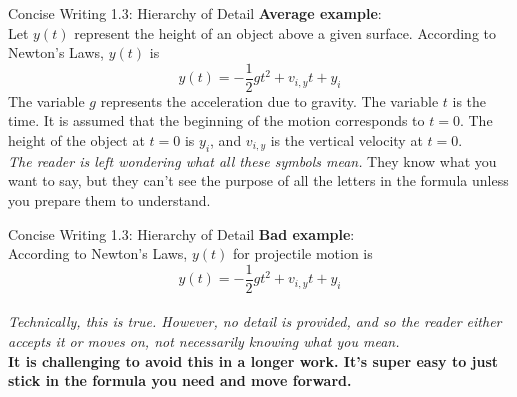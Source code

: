 \documentclass{beamer}
\begin{document}
\begin{frame}{Concise Writing 1.3: Hierarchy of Detail}
\alert{\textbf{Average example}}: \\
Let $y(t)$ represent the height of an object above a given surface.  According to Newton's Laws, $y(t)$ is
\begin{equation}
y(t) = -\frac{1}{2}gt^2 + v_{i,y} t + y_i
\end{equation}
The variable $g$ represents the acceleration due to gravity.  The variable $t$ is the time.  It is assumed that the beginning of the motion corresponds to $t = 0$.  The height of the object at $t = 0$ is $y_i$, and $v_{i,y}$ is the vertical velocity at $t = 0$. \\ \vspace{0.5cm}
\textit{The reader is left wondering what all these symbols mean.}  They know what you want to say, but they can't see the purpose of all the letters in the formula unless you prepare them to understand.
\end{frame}

\begin{frame}{Concise Writing 1.3: Hierarchy of Detail}
\alert{\textbf{Bad example}}: \\
According to Newton's Laws, $y(t)$ for projectile motion is
\begin{equation}
y(t) = -\frac{1}{2}gt^2 + v_{i,y} t + y_i
\end{equation} \\ \vspace{0.5cm}
\textit{Technically, this is true.  However, no detail is provided, and so the reader either accepts it or moves on, not necessarily knowing what you mean.} \\ \vspace{0.5cm}
\textbf{It is challenging to avoid this in a longer work.  It's super easy to just stick in the formula you need and move forward.}
\end{frame}
\end{document}

